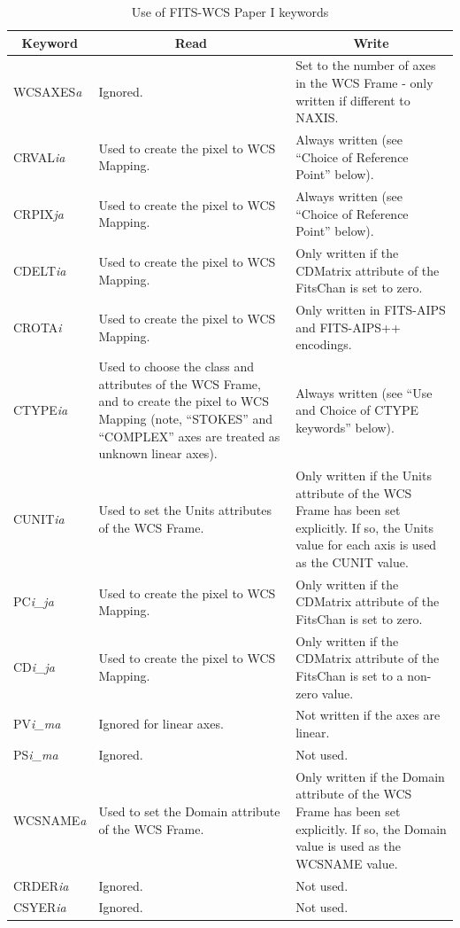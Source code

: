 \documentclass[twoside,11pt]{article}
\newcommand{\fitskey}[3]{{#1}&{#2}&{#3}\\}
\begin{document}
\begin{table}[htbp]
\begin{tabular}{|l|p{2.5in}|p{2.5in}|}
\hline
\multicolumn{1}{|c|}{{\bf Keyword}} & \multicolumn{1}{c|}{{\bf Read}} 
& \multicolumn{1}{c|}{{\bf Write}} \\ \hline

\fitskey{WCSAXES\emph{a}}{Ignored.}{Set to the number of axes in the WCS
Frame - only written if different to NAXIS.}

\fitskey{CRVAL\emph{ia}}{Used to create the pixel to WCS
Mapping.}{Always written (see ``Choice of Reference
Point'' below).}

\fitskey{CRPIX\emph{ja}}{Used to create the pixel to WCS Mapping.}{Always
written (see ``Choice of Reference Point'' below).}

\fitskey{CDELT\emph{ia}}{Used to create the pixel to WCS Mapping.}{Only
written if the CDMatrix attribute of the FitsChan is 
set to zero.}

\fitskey{CROTA\emph{i}}{Used to create the pixel to WCS Mapping.}{Only
written in FITS-AIPS and FITS-AIPS++ encodings.}

\fitskey{CTYPE\emph{ia}}{Used to choose the class and attributes of the
WCS Frame, and to create the pixel to WCS Mapping (note, ``STOKES'' and
``COMPLEX'' axes are treated as unknown linear axes).}{Always written
(see ``Use and Choice of CTYPE keywords'' below).}

\fitskey{CUNIT\emph{ia}}{Used to set the Units attributes
of the WCS Frame.}{Only written if the Units attribute of the WCS Frame
has been set explicitly. If so, the Units value for each axis is used as
the CUNIT value.}

\fitskey{PC\emph{i\_j}\emph{a}}{Used to create the pixel to WCS
Mapping.}{Only written if the CDMatrix attribute of the FitsChan is set to
zero.}

\fitskey{CD\emph{i\_j}\emph{a}}{Used to create the pixel to WCS
Mapping.}{Only written if the CDMatrix attribute of the FitsChan is set to
a non-zero value.}

\fitskey{PV\emph{i\_ma}}{Ignored for linear axes.}{Not written if the axes
are linear.}

\fitskey{PS\emph{i\_ma}}{Ignored.}{Not used.}

\fitskey{WCSNAME\emph{a}}{Used to set the Domain attribute
of the WCS Frame.}{Only written if the Domain attribute of the WCS Frame
has been set explicitly. If so, the Domain value is used as the WCSNAME
value.}

\fitskey{CRDER\emph{ia}}{Ignored.}{Not used.}

\fitskey{CSYER\emph{ia}}{Ignored.}{Not used.}

\hline
\end{tabular}
\vspace{3.mm}
\caption{Use of FITS-WCS Paper I keywords}
\label{tab:fitspaper1}
\end{table}
\end{document}
